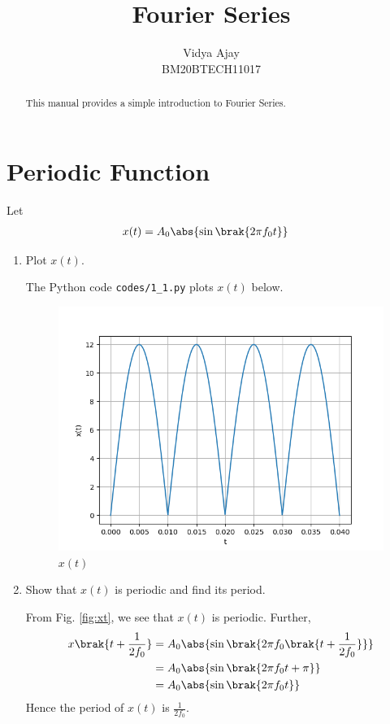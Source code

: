 \documentclass[journal,12pt,twocolumn]{IEEEtran}
\renewcommand\thesection{\arabic{section}}
\begin{document}
\vspace{3cm}
\title{Fourier Series}
\author{Vidya Ajay\\BM20BTECH11017}
\maketitle
\tableofcontents
\renewcommand{\thefigure}{\theenumi}
\renewcommand{\thetable}{\theenumi}
\bigskip
\begin{abstract}
This manual provides a simple introduction to Fourier Series.
\end{abstract}
\section{Periodic Function}
Let 
\begin{align}
	x(t) &= A_0\abs{\sin\brak{2\pi f_0 t}}
	\label{eq:10-orig-diff-def}
\end{align}
\begin{enumerate}[label=\thesection.\arabic*
,ref=\thesection.\theenumi]
\item Plot $x(t)$.

\solution The Python code \texttt{codes/1\_1.py} plots $x(t)$ below.
\begin{figure}[!htp]
    \includegraphics[width=\columnwidth]{figs/1_1.png}
    \caption{$x(t)$}
    \label{fig:xt}
\end{figure}
\item Show that $x(t)$ is periodic and find its period.

\solution From Fig. \eqref{fig:xt}, we see that $x(t)$ is periodic. Further,
\begin{align}
    x\brak{t+\frac{1}{2f_0}} &= A_0\abs{\sin\brak{2\pi f_0\brak{t + \frac{1}{2f_0}}}} \\
                            &= A_0\abs{\sin\brak{2\pi f_0t + \pi}} \\
                            &= A_0\abs{\sin\brak{2\pi f_0t}}
\end{align}
Hence the period of $x(t)$ is $\frac{1}{2f_0}$.
\end{enumerate}
\end{document}
